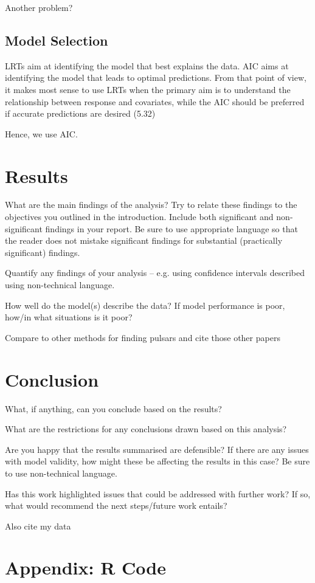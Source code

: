 \documentclass[11pt, oneside]{article}
\begin{document}
{\color{red} Another problem?}


\subsection{Model Selection}

LRTs aim at identifying the model that best explains the data. AIC aims at identifying the model that leads to optimal predictions. From that point of view, it makes most sense to use LRTs when the primary aim is to understand the relationship between response and covariates, while the AIC should be preferred if accurate predictions are desired (5.32)

Hence, we use AIC. 

\section{Results}

What are the main findings of the analysis? Try to relate these findings to the objectives you outlined in the introduction. Include both significant and non-significant findings in your report. Be sure to use appropriate language so that the reader does not mistake significant findings for substantial (practically significant) findings.

Quantify any findings of your analysis – e.g. using confidence intervals described using non-technical language.

How well do the model(s) describe the data? If model performance is poor, how/in what situations is it poor?

Compare to other methods for finding pulsars and cite those other papers 

\section{Conclusion}

What, if anything, can you conclude based on the results? 

What are the restrictions for any conclusions drawn based on this analysis?

Are you happy that the results summarised are defensible? If there are any issues with model validity, how might these be affecting the results in this case? Be sure to use non-technical language.

Has this work highlighted issues that could be addressed with further work? If so, what would recommend the next steps/future work entails?

\begin{thebibliography}{9}

 
{\color{red}Also cite my data }
 
\end{thebibliography}

\section*{Appendix: R Code}
\end{document}
